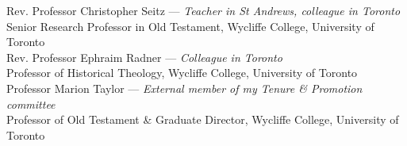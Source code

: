 \documentclass[11pt]{article}
\begin{document}

Rev. Professor Christopher Seitz --- \emph{Teacher in St Andrews, colleague in Toronto}\\
Senior Research Professor in Old Testament, Wycliffe College, University of Toronto\\

Rev. Professor Ephraim Radner --- \emph{Colleague in Toronto}\\
Professor of Historical Theology, Wycliffe College, University of Toronto\\

Professor Marion Taylor --- \emph{External member of my Tenure \& Promotion committee}\\
Professor of Old Testament \& Graduate Director, Wycliffe College, University of Toronto\\
\end{document}
